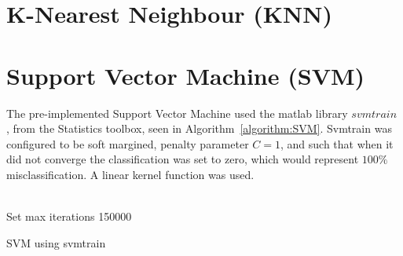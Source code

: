 \section{K-Nearest Neighbour (KNN)}


\section{Support Vector Machine (SVM)}
The pre-implemented Support Vector Machine used the matlab library $svmtrain$ \citep{svmtrain_ref}, from the Statistics toolbox, seen in Algorithm~\ref{algorithm:SVM}.  Svmtrain was configured to be soft margined, penalty parameter $C = 1$, and such that when it did not converge the classification was set to zero, which would represent $100\%$ misclassification. A linear kernel function was used. \\\\
\begin{algorithm}[H]
\SetAlgoLined
{}

Set max iterations 150000 \\
 \caption{SVM using svmtrain}
 \label{algorithm:SVM}
\end{algorithm}

